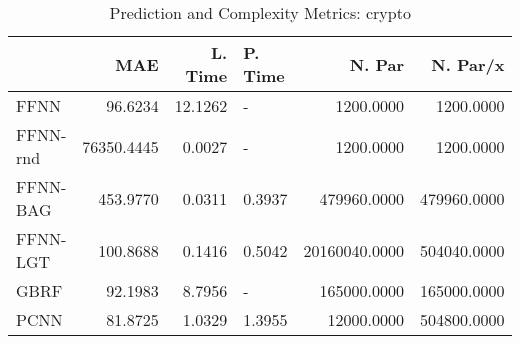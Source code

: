 \begin{table}
\centering
\caption{Prediction and Complexity Metrics: crypto}
\label{tab__crypto__Fix_Neurons_QTrue}
\begin{tabular}{lrrlrr}
\toprule
{} &        MAE &  L. Time & P. Time &        N. Par &    N. Par/x \\
\midrule
FFNN     &    96.6234 &  12.1262 &       - &     1200.0000 &   1200.0000 \\
FFNN-rnd & 76350.4445 &   0.0027 &       - &     1200.0000 &   1200.0000 \\
FFNN-BAG &   453.9770 &   0.0311 &  0.3937 &   479960.0000 & 479960.0000 \\
FFNN-LGT &   100.8688 &   0.1416 &  0.5042 & 20160040.0000 & 504040.0000 \\
GBRF     &    92.1983 &   8.7956 &       - &   165000.0000 & 165000.0000 \\
PCNN     &    81.8725 &   1.0329 &  1.3955 &    12000.0000 & 504800.0000 \\
\bottomrule
\end{tabular}
\end{table}
